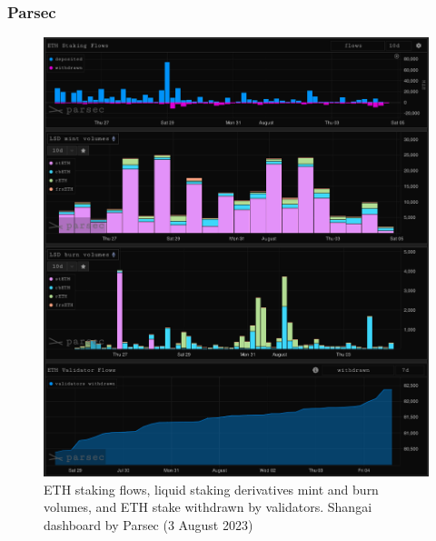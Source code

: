 \documentclass[UTF8]{article}
\begin{document}
\subsubsection*{Parsec}
\begin{figure}[htbp]
\begin{center}
\includegraphics[width=0.8\linewidth]{images/parsec1}
\caption{ETH staking flows, liquid staking derivatives mint and burn volumes, and ETH stake withdrawn by validators. Shangai dashboard by Parsec (3 August 2023)}
\label{fig:parsec1}
\end{center}
\end{figure}
\end{document}
